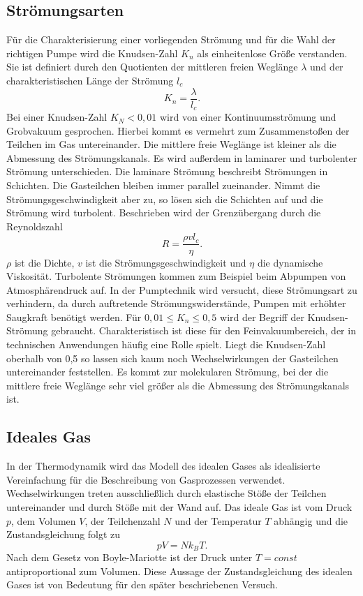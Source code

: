 \subsection{Strömungsarten}
Für die Charakterisierung einer vorliegenden Strömung und für die Wahl der richtigen Pumpe wird die Knudsen-Zahl $K_n$ als einheitenlose Größe verstanden.
Sie ist definiert durch den Quotienten der mittleren freien Weglänge $\lambda$ und der charakteristischen Länge der Strömung $l_c$
\begin{equation}
  K_n=\frac{\lambda}{l_c}.
\end{equation}
Bei einer Knudsen-Zahl $K_N < 0,01$ wird von einer Kontinuumsströmung und Grobvakuum gesprochen. Hierbei kommt es vermehrt zum Zusammenstoßen der Teilchen im Gas
untereinander. Die mittlere freie Weglänge ist kleiner als die Abmessung des Strömungskanals.
Es wird außerdem in laminarer und turbolenter Strömung unterschieden.
Die laminare Strömung beschreibt Strömungen in Schichten. Die Gasteilchen bleiben immer parallel zueinander.
Nimmt die Strömungsgeschwindigkeit aber zu, so lösen sich die Schichten auf und die Strömung wird turbolent.
Beschrieben wird der Grenzübergang durch die Reynoldszahl
\begin{equation}
  R=\frac{\rho v l_c}{\eta}.
\end{equation}
$\rho$ ist die Dichte, $v$ ist die Strömungsgeschwindigkeit und $\eta$ die dynamische Viskosität.
Turbolente Strömungen kommen zum Beispiel beim Abpumpen von Atmosphärendruck auf.
In der Pumptechnik wird versucht, diese Strömungsart zu verhindern, da durch auftretende Strömungswiderstände, Pumpen mit erhöhter Saugkraft benötigt werden.\newline
Für $ 0,01 \leq K_n \leq 0,5$ wird der Begriff der Knudsen-Strömung gebraucht.
Charakteristisch ist diese für den Feinvakuumbereich, der in technischen Anwendungen häufig eine Rolle spielt.\newline
Liegt die Knudsen-Zahl oberhalb von 0,5 so lassen sich kaum noch Wechselwirkungen der Gasteilchen untereinander feststellen.
Es kommt zur molekularen Strömung, bei der die mittlere freie Weglänge sehr viel größer als die Abmessung des Strömungskanals ist.
\subsection{Ideales Gas}
In der Thermodynamik wird das Modell des idealen Gases als idealisierte Vereinfachung für die Beschreibung von Gasprozessen verwendet.
Wechselwirkungen treten ausschließlich durch elastische Stöße der Teilchen untereinander und durch Stöße mit der Wand auf.
Das ideale Gas ist vom Druck $p$, dem Volumen $V$, der Teilchenzahl $N$ und der Temperatur $T$ abhängig und die Zustandsgleichung
folgt zu
\begin{equation}
pV=N k_B T.
\label{eq:idealesgas}
\end{equation}
Nach dem Gesetz von Boyle-Mariotte ist der Druck unter $T=const$ antiproportional zum Volumen.
Diese Aussage der Zustandsgleichung des idealen Gases ist von Bedeutung für den später beschriebenen Versuch.
